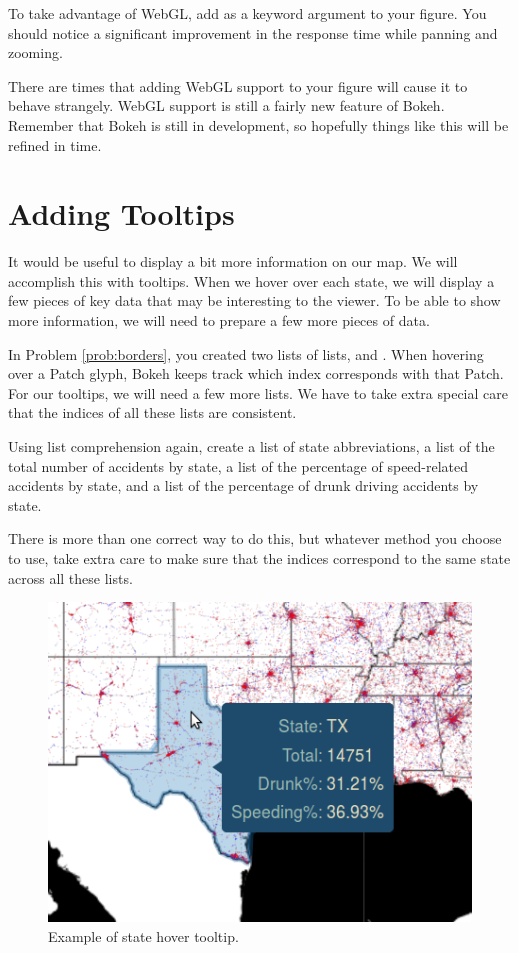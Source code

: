 \begin{problem} \label{prob:webgl}
To take advantage of WebGL, add  as a keyword argument to
your figure. You should notice a significant improvement in the response time
while panning and zooming.

\begin{info}
There are times that adding WebGL support to your figure will cause it to behave
strangely. WebGL support is still a fairly new feature of Bokeh. Remember
that Bokeh is still in development, so hopefully things like this will be refined
in time.
\end{info}
\end{problem}

\section*{Adding Tooltips}
It would be useful to display a bit more information on our map. We will
accomplish this with tooltips. When we hover over each state, we will display
a few pieces of key data that may be interesting to the viewer.
To be able to show more information, we will need to prepare a few more
pieces of data.

\begin{problem} \label{prob:lists}
In Problem \ref{prob:borders}, you created two lists of lists,  and
. When hovering over a Patch glyph, Bokeh keeps track which index
corresponds with that Patch. For our tooltips, we will need a few more lists. We
have to take extra special care that the indices of all these lists are
consistent.

Using list comprehension again, create a list of state abbreviations, a list of
the total number of accidents by state, a list of the percentage of speed-related
accidents by state, and a list of the percentage of drunk driving accidents by
state.

There is more than one correct way to do this, but whatever method you choose to
use, take extra care to make sure that the indices correspond to the same state
across all these lists.
\end{problem}

\begin{figure}
    \includegraphics[width=.5\linewidth]{BokehFigs/hover.png}
    \caption{Example of state hover tooltip.}
    \label{fig:hover}
\end{figure}

